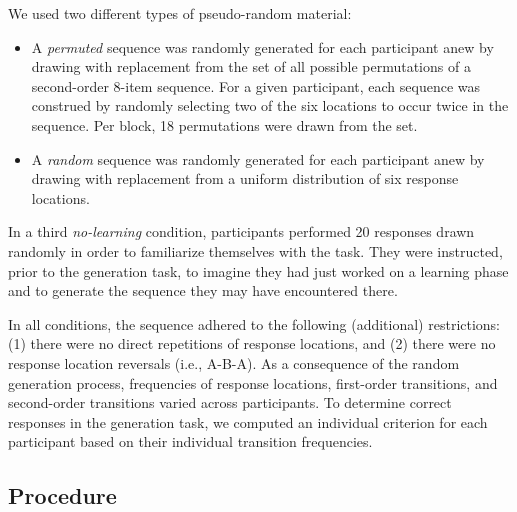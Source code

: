 \documentclass[
  english,
  man]{apa6}
\providecommand{\tightlist}{%
  \setlength{\itemsep}{0pt}\setlength{\parskip}{0pt}}
\begin{document}
We used two different types of pseudo-random material:

\begin{itemize}
\tightlist
\item
  A \emph{permuted} sequence was randomly generated for each participant anew by drawing with replacement from the set of all possible permutations of a second-order 8-item sequence. For a given participant, each sequence was construed by randomly selecting two of the six locations to occur twice in the sequence. Per block, 18 permutations were drawn from the set.
\item
  A \emph{random} sequence was randomly generated for each participant anew by drawing with replacement from a uniform distribution of six response locations.
\end{itemize}

In a third \emph{no-learning} condition, participants performed 20 responses drawn randomly in order to familiarize themselves with the task.
They were instructed, prior to the generation task, to imagine they had just worked on a learning phase and to generate the sequence they may have encountered there.

In all conditions, the sequence adhered to the following (additional) restrictions:
(1) there were no direct repetitions of response locations, and (2) there were no response location reversals (i.e., A-B-A).
As a consequence of the random generation process, frequencies of response locations, first-order transitions, and second-order transitions varied across participants.
To determine correct responses in the generation task, we computed an individual criterion for each participant based on their individual transition frequencies.

\hypertarget{procedure}{%
\subsection{Procedure}\label{procedure}}
\end{document}
